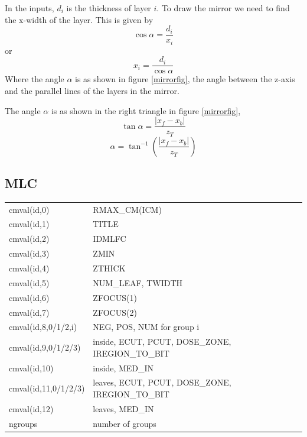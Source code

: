 \documentclass[12pt]{book}
\begin{document}
In the inputs, $d_i$ is the thickness of layer $i$.  To draw the mirror
we need to find the x-width of the layer.  This is given by
$$ \cos\alpha=\frac{d_i}{x_i}$$
or
$$ x_i=\frac{d_i}{\cos\alpha}$$
Where the angle $\alpha$ is as shown in figure \ref{mirrorfig}, the
angle between the z-axis and the parallel lines of the layers in the mirror.

The angle $\alpha$ is as shown in the right triangle in figure \ref{mirrorfig},
$$\tan\alpha=\frac{|x_f-x_b|}{z_T}$$
$$\alpha=\tan^{-1}\left(\frac{|x_f-x_b|}{z_T}\right)$$

\subsection{MLC}

\begin{tabular}{|p{4.5cm}|p{11.5cm}|}\hline
cmval(id,0) &  RMAX\_CM(ICM) \\
cmval(id,1) &  TITLE \\
cmval(id,2) &  IDMLFC \\
cmval(id,3) &  ZMIN \\
cmval(id,4) &  ZTHICK \\
cmval(id,5) &  NUM\_LEAF, TWIDTH \\
cmval(id,6) &  ZFOCUS(1) \\
cmval(id,7) &  ZFOCUS(2) \\
cmval(id,8,0/1/2,i) &  NEG, POS, NUM for group i\\
cmval(id,9,0/1/2/3) &  inside, ECUT, PCUT, DOSE\_ZONE, IREGION\_TO\_BIT\\
cmval(id,10) &  inside, MED\_IN \\
cmval(id,11,0/1/2/3) &  leaves, ECUT, PCUT, DOSE\_ZONE, IREGION\_TO\_BIT\\
cmval(id,12) &  leaves, MED\_IN \\
ngroups & number of groups \\ \hline
\end{tabular}
\end{document}

